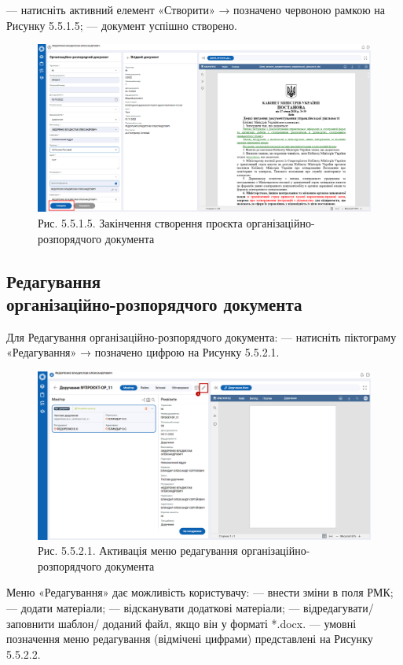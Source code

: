 --- натисніть активний елемент «Створити» → позначено червоною рамкою на Рисунку 5.5.1.5;
--- документ успішно створено.

\begin{figure}[!htbp]
\centerline{\includegraphics[width=\textwidth]{img/5.5.1.5.png}}
\caption{Рис. 5.5.1.5. Закінчення створення проєкта організаційно-розпорядчого документа}
\end{figure}

\subsection{Редагування \\ організаційно-розпорядчого документа}

Для Редагування організаційно-розпорядчого документа:
--- натисніть піктограму «Редагування» → позначено цифрою  на Рисунку 5.5.2.1.

\begin{figure}[!htbp]
\centerline{\includegraphics[width=\textwidth]{img/5.5.2.1.png}}
\caption{Рис. 5.5.2.1. Активація меню редагування організаційно-розпорядчого документа}
\end{figure}

Меню «Редагування» дає можливість користувачу:
 --- внести зміни в поля РМК;
 --- додати матеріали;
 --- відсканувати додаткові матеріали;
 --- відредагувати/ заповнити шаблон/ доданий файл, якщо він у форматі *.docx.
--- умовні позначення меню редагування (відмічені цифрами) представлені на Рисунку 5.5.2.2.

